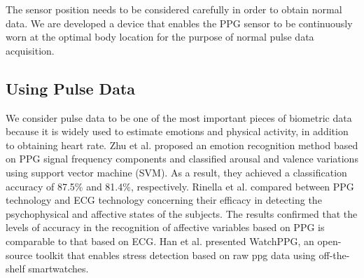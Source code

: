 \documentclass[sigconf]{acmart}
\begin{document}
The sensor position needs to be considered carefully in order to obtain normal data. We are developed a device that enables the PPG sensor to be continuously worn at the optimal body location for the purpose of normal pulse data acquisition.


\subsection{Using Pulse Data}
We consider pulse data to be one of the most important pieces of biometric data because it is widely used to estimate emotions and physical activity, in addition to obtaining heart rate.
Zhu et al.\cite{emotion_recognition_zhu} proposed an emotion recognition method based on PPG signal frequency components and classified arousal and valence variations using support vector machine (SVM). As a result, they achieved a classification accuracy of 87.5\% and 81.4\%, respectively.
Rinella et al.\cite{emotion_recognition_rinella} compared between PPG technology and ECG technology concerning their efficacy in detecting the psychophysical and affective states of the subjects. The results confirmed that the levels of accuracy in the recognition of affective variables based on PPG is comparable to that based on ECG.
Han et al.\cite{stress_detection} presented WatchPPG, an open-source toolkit that enables stress detection based on raw ppg data using off-the-shelf smartwatches.
\end{document}

